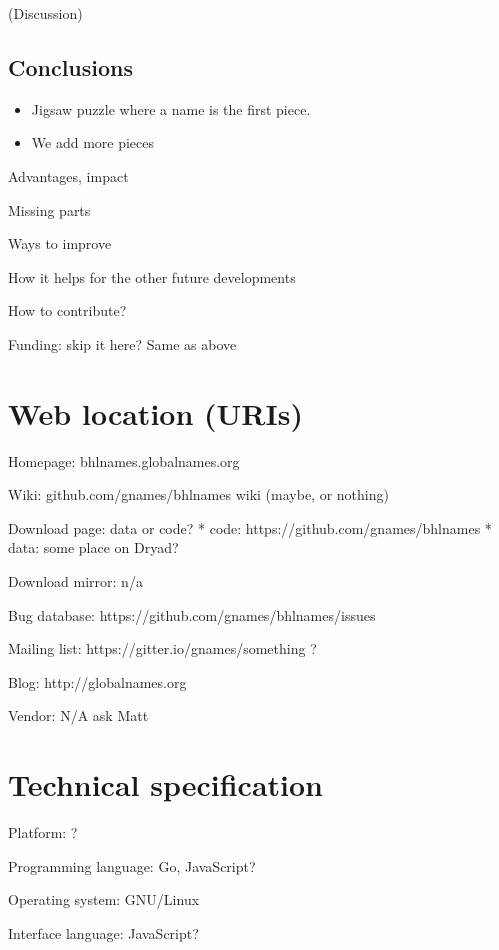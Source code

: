 \documentclass[
]{article}
\providecommand{\tightlist}{%
  \setlength{\itemsep}{0pt}\setlength{\parskip}{0pt}}
\begin{document}
(Discussion)

\hypertarget{conclusions}{%
\subsection{Conclusions}\label{conclusions}}

\begin{itemize}
\tightlist
\item
  Jigsaw puzzle where a name is the first piece.
\item
  We add more pieces
\end{itemize}

Advantages, impact

Missing parts

Ways to improve

How it helps for the other future developments

How to contribute?

Funding: skip it here? Same as above

\hypertarget{web-location-uris}{%
\section{Web location (URIs)}\label{web-location-uris}}

Homepage: bhlnames.globalnames.org

Wiki: github.com/gnames/bhlnames wiki (maybe, or nothing)

Download page: data or code? * code: https://github.com/gnames/bhlnames
* data: some place on Dryad?

Download mirror: n/a

Bug database: https://github.com/gnames/bhlnames/issues

Mailing list: https://gitter.io/gnames/something ?

Blog: http://globalnames.org

Vendor: N/A ask Matt

\hypertarget{technical-specification}{%
\section{Technical specification}\label{technical-specification}}

Platform: ?

Programming language: Go, JavaScript?

Operating system: GNU/Linux

Interface language: JavaScript?
\end{document}
